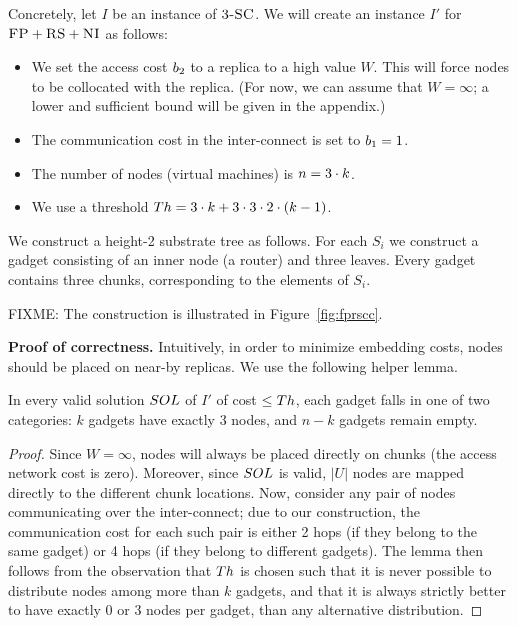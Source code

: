 Concretely, let $I$ be an instance of $\textsc{3-SC}$. We will create an instance $I'$
for $\textsc{FP}+\textsc{RS}+\textsc{NI}$ as follows:
\begin{itemize}
\item We set the access cost $b_2$ to a replica to a high value $W$. This will force
nodes to be collocated with the replica.
(For now, we can assume that $W=\infty$; a lower and sufficient bound will be given
in the appendix.)
\item The communication cost in the inter-connect is set to $b_1 = 1$.
\item The number of nodes (virtual machines) is $n = 3 \cdot k$.
\item We use a threshold $Th =  3 \cdot k + 3 \cdot 3 \cdot 2 \cdot (k - 1)$.
\end{itemize}

We construct a height-2 substrate tree
as follows. For each $S_i$ we construct a gadget
consisting of an inner node (a router) and three leaves. Every gadget
contains three chunks, corresponding to the elements of $S_i$.

FIXME: The construction is illustrated in Figure~\ref{fig:fprscc}.

\textbf{Proof of correctness.}
Intuitively, in order to minimize embedding costs,
nodes should be placed on near-by replicas. We use the following
helper lemma.
\begin{lemma}\label{lemma:helper}
In every valid solution $SOL$ of $I'$ of cost $\leq Th$, each gadget
falls in one of two categories:
$k$ gadgets have exactly
$3$ nodes, and $n-k$ gadgets remain empty.
\end{lemma}
\begin{proof}
Since $W=\infty$, nodes will always be placed
directly on chunks (the access network cost is zero).
Moreover, since
$SOL$ is valid, $|U|$ nodes are mapped
directly to the different chunk locations.
Now, consider any pair of nodes communicating over the
inter-connect; due to our construction, the communication cost
for each such pair is either
2 hops (if they belong to the same gadget) or 4 hops (if they belong
to different gadgets).
The lemma then follows from the observation that $Th$
is chosen such that it is never possible to distribute nodes
among more than $k$ gadgets, and that it is always strictly better to
have exactly 0 or 3 nodes per gadget, than any alternative distribution.
\end{proof}

